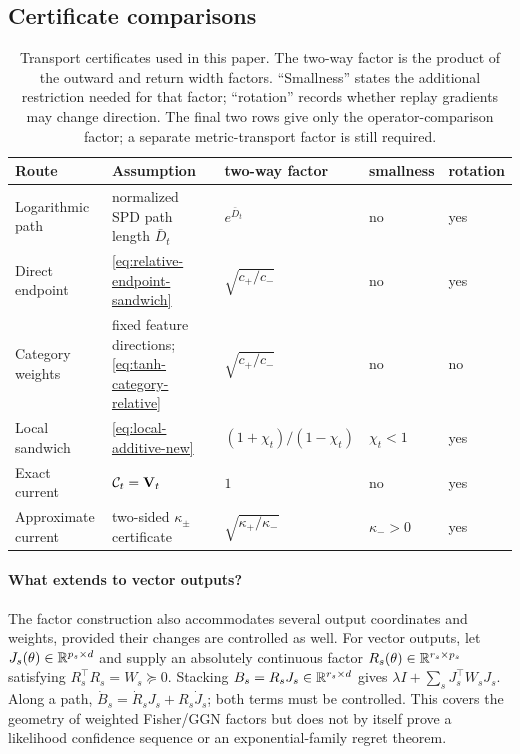 \subsection{Certificate comparisons}


\begin{table}[t]
\caption{Transport certificates used in this paper.  The two-way factor is
the product of the outward and return width factors.  ``Smallness'' states
the additional restriction needed for that factor; ``rotation'' records
whether replay gradients may change direction. The final two rows give only
the operator-comparison factor; a separate metric-transport factor is still
required.}
\label{tab:transport-comparison-new}
\centering\ccetablesize
\begin{tabularx}{\columnwidth}{@{}
  >{\raggedright\arraybackslash}p{}
  >{\raggedright\arraybackslash}X
  >{\raggedright\arraybackslash}p{}
  >{\centering\arraybackslash}p{}
  >{\centering\arraybackslash}p{}@{}}
\toprule
Route & Assumption & two-way factor & smallness & rotation \\
\midrule
Logarithmic path & normalized SPD path length $\bar D_t$ & $e^{\bar D_t}$ & no & yes \\
Direct endpoint & \eqref{eq:relative-endpoint-sandwich} & $\sqrt{c_+/c_-}$ & no & yes \\
Category weights & fixed feature directions; \eqref{eq:tanh-category-relative} & $\sqrt{c_+/c_-}$ & no & no \\
Local sandwich & \eqref{eq:local-additive-new} & $(1+\chi_t)/(1-\chi_t)$ & $\chi_t<1$ & yes \\
Exact current & $\mathcal{C}_t=\mathbf{V}_t$ & $1$ & no & yes \\
Approximate current & two-sided $\kappa_\pm$ certificate & $\sqrt{\kappa_+/\kappa_-}$ & $\kappa_->0$ & yes \\
\bottomrule
\end{tabularx}

\end{table}

\paragraph{What extends to vector outputs?}
The factor construction also accommodates several output coordinates and
weights, provided their changes are controlled as well.  For vector outputs,
let $J_s(\theta)\in\mathbb{R}^{p_s\times d}$ and supply an
absolutely continuous factor $R_s(\theta)\in\mathbb{R}^{r_s\times p_s}$ satisfying
$R_s^\top R_s=W_s\succeq0$.  Stacking
$B_s=R_sJ_s\in\mathbb{R}^{r_s\times d}$ gives
$\lambda I+\sum_sJ_s^\top W_sJ_s$.  Along a path,
$\dot B_s=\dot R_sJ_s+R_s\dot J_s$; both terms must be controlled.  This
covers the geometry of weighted Fisher/GGN factors but does not by itself prove
a likelihood confidence sequence or an exponential-family regret theorem.

